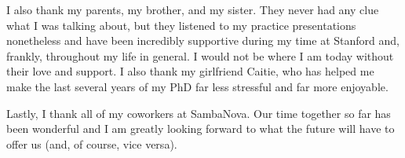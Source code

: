 I also thank my parents, my brother, and my sister. They never had any
clue what I was talking about, but they listened to my practice presentations
nonetheless and have been incredibly supportive during my time at Stanford and,
frankly, throughout my life in general. I would not be where I am today without
their love and support. I also thank my girlfriend Caitie, who has helped me
make the last several years of my PhD far less stressful and far more enjoyable.

Lastly, I thank all of my coworkers at SambaNova. Our time
together so far has been wonderful and I am greatly looking forward to what
the future will have to offer us (and, of course, vice versa).
